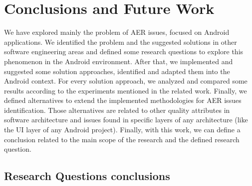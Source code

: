 \chapter{Conclusions and Future Work}
\label{cha:conclusions}
We have explored mainly the problem of AER issues, focused on Android applications. We identified the problem and the suggested solutions in other software engineering areas and defined some research questions to explore this phenomenon in the Android environment. After that, we implemented and suggested some solution approaches, identified and adapted them into the Android context. For every solution approach, we analyzed and compared some results according to the experiments mentioned in the related work. Finally, we defined alternatives to extend the implemented methodologies for AER issues identification. Those alternatives are related to other quality attributes in software architecture and issues found in specific layers of any architecture (like the UI layer of any Android project). Finally, with this work, we can define a conclusion related to the main scope of the research and the defined research question.

\section{Research Questions conclusions}

